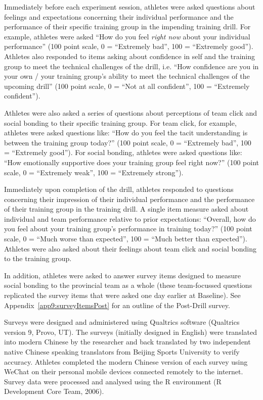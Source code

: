 \begin{CJK}{UTF8}{gbsn}
Immediately before each experiment session, athletes were asked questions about feelings and expectations concerning their individual performance and the performance of their specific training group in the impending training drill.  For example, athletes were asked ``How do you feel \textit{right now} about your individual performance'' (100 point scale, 0 = ``Extremely bad'', 100 = ``Extremely good'').  Athletes also responded to items asking about confidence in self and the training group to meet the technical challenges of the drill, i.e. ``How confidence are you in your own / your training group's ability to meet the technical challenges of the upcoming drill'' (100 point scale, 0 = ``Not at all confident'', 100 = ``Extremely confident'').

Athletes were also asked a series of questions about perceptions of team click and social bonding to their specific training group. For team click, for example, athletes were asked questions like: ``How do you feel the tacit understanding is between the training group today?'' (100 point scale, 0 = ``Extremely bad'', 100 = ``Extremely good'').  For social bonding, athletes were asked questions like: ``How emotionally supportive does your training group feel right now?'' (100 point scale, 0 = ``Extremely weak'', 100 = ``Extremely strong'').


Immediately upon completion of the drill, athletes responded to questions concerning their impression of their individual performance and the performance of their training group in the training drill. A  single item measure asked about individual and team performance relative to prior expectations: ``Overall, how do you feel about your training group's performance in training today?'' (100 point scale, 0 = ``Much worse than expected'', 100 = ``Much better than expected'').  Athletes were also asked about their feelings about team click and social bonding to the training group.

In addition, athletes were asked to answer survey items designed to measure social bonding to the provincial team as a whole (these team-focussed questions replicated the survey items that were asked one day earlier at Baseline).  See Appendix~\ref{app9:surveyItemsPost} for an outline of the Post-Drill survey.

Surveys were designed and administered using Qualtrics software (Qualtrics version 9, Provo, UT). The surveys (initially designed in English) were translated into modern Chinese by the researcher and back translated by two independent native Chinese speaking translators from Beijing Sports University to verify accuracy.  Athletes completed the modern Chinese version of each survey using WeChat on their personal mobile devices connected remotely to the internet. Survey data were processed and analysed using the R environment (R Development Core Team, 2006).


\end{CJK}
